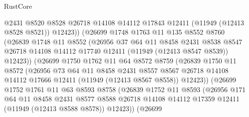 \begin{lexlean}{RustCore}
\begin{coremodule}
                    @2431
                    @8520
                    @8528
                    @26718
                    @14108
                    @14112
                    @17843
                    @12411
                    (@11949 (@12413 @8528 @8521))
                    @12423))
                (@26699
                  @1748
                  @1763
                  @11
                  @135
                  @8552
                  @8760
                  (@26839
                    @1748
                    @11
                    @8552
                    (@26956
                      @37
                      @64
                      @11
                      @8458
                      @2431
                      @8538
                      @8547
                      @26718
                      @14108
                      @14112
                      @17740
                      @12411
                      (@11949 (@12413 @8547 @8539))
                      @12423))
                  (@26699
                    @1750
                    @1762
                    @11
                    @64
                    @8572
                    @8759
                    (@26839
                      @1750
                      @11
                      @8572
                      (@26956
                        @73
                        @64
                        @11
                        @8458
                        @2431
                        @8557
                        @8567
                        @26718
                        @14108
                        @14112
                        @17666
                        @12411
                        (@11949 (@12413 @8567 @8558))
                        @12423))
                    (@26699
                      @1752
                      @1761
                      @11
                      @63
                      @8593
                      @8758
                      (@26839
                        @1752
                        @11
                        @8593
                        (@26956
                          @171
                          @64
                          @11
                          @8458
                          @2431
                          @8577
                          @8588
                          @26718
                          @14108
                          @14112
                          @17359
                          @12411
                          (@11949 (@12413 @8588 @8578))
                          @12423))
                      (@26699

\end{coremodule}
\end{lexlean}
